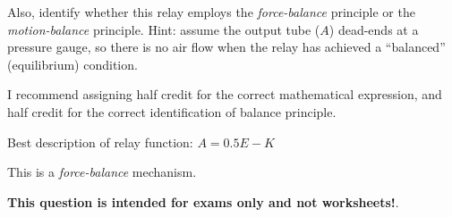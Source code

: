 Also, identify whether this relay employs the {\it force-balance} principle or the {\it motion-balance} principle.  Hint: assume the output tube ($A$) dead-ends at a pressure gauge, so there is no air flow when the relay has achieved a ``balanced'' (equilibrium) condition.







I recommend assigning half credit for the correct mathematical expression, and half credit for the correct identification of balance principle.

\vskip 10pt

Best description of relay function:  $A = 0.5E - K$

\vskip 10pt

This is a {\it force-balance} mechanism.







{\bf This question is intended for exams only and not worksheets!}.



